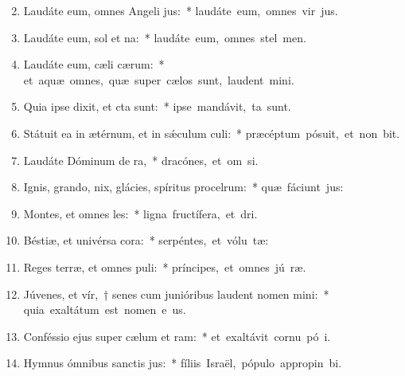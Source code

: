 \begin{flushleft}
\begin{enumerate}[leftmargin=*]
\setcounter{enumi}{1}

\item Laudáte eum, omnes Angeli jus:~* \mbox{laudáte eum, omnes vir jus.}
\item Laudáte eum, sol et na:~* \mbox{laudáte eum, omnes stel  men.}
\item Laudáte eum, cæli cærum:~* \mbox{et aquæ omnes, quæ super cælos sunt, laudent  mini.}
\item Quia ipse dixit, et cta sunt:~* \mbox{ipse mandávit,  ta sunt.}
\item Státuit ea in ætérnum, et in s\'{\ae}culum culi:~* \mbox{præcéptum pósuit, et non bit.}
\item Laudáte Dóminum de ra,~* \mbox{dracónes, et om si.}
\item Ignis, grando, nix, glácies, spíritus procelrum:~* \mbox{quæ fáciunt  jus:}
\item Montes, et omnes les:~* \mbox{ligna fructífera, et  dri.}
\item Béstiæ, et univérsa cora:~* \mbox{serpéntes, et vólu tæ:}
\item Reges terræ, et omnes puli:~* \mbox{príncipes, et omnes jú ræ.}
\item Júvenes, et vír,~† senes cum junióribus laudent nomen mini:~* \mbox{quia exaltátum est nomen e us.}
\item Conféssio ejus super cælum et ram:~* \mbox{et exaltávit cornu pó i.}
\item Hymnus ómnibus sanctis jus:~* \mbox{fíliis Israël, pópulo appropin bi.}

\end{enumerate}
\end{flushleft}

